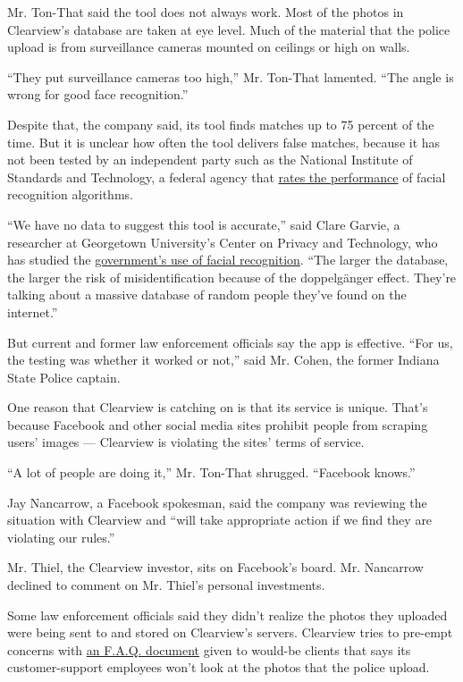 Mr. Ton-That said the tool does not always work. Most of the photos in
Clearview's database are taken at eye level. Much of the material that
the police upload is from surveillance cameras mounted on ceilings or
high on walls.

``They put surveillance cameras too high,'' Mr. Ton-That lamented. ``The
angle is wrong for good face recognition.''

Despite that, the company said, its tool finds matches up to 75 percent
of the time. But it is unclear how often the tool delivers false
matches, because it has not been tested by an independent party such as
the National Institute of Standards and Technology, a federal agency
that
\href{https://www.nist.gov/programs-projects/face-recognition-vendor-test-frvt-ongoing}{rates
the performance} of facial recognition algorithms.

``We have no data to suggest this tool is accurate,'' said Clare Garvie,
a researcher at Georgetown University's Center on Privacy and
Technology, who has studied the
\href{https://www.flawedfacedata.com/}{government's use of facial
recognition}. ``The larger the database, the larger the risk of
misidentification because of the doppelgänger effect. They're talking
about a massive database of random people they've found on the
internet.''

But current and former law enforcement officials say the app is
effective. ``For us, the testing was whether it worked or not,'' said
Mr. Cohen, the former Indiana State Police captain.

One reason that Clearview is catching on is that its service is unique.
That's because Facebook and other social media sites prohibit people
from scraping users' images --- Clearview is violating the sites' terms
of service.

``A lot of people are doing it,'' Mr. Ton-That shrugged. ``Facebook
knows.''

Jay Nancarrow, a Facebook spokesman, said the company was reviewing the
situation with Clearview and ``will take appropriate action if we find
they are violating our rules.''

Mr. Thiel, the Clearview investor, sits on Facebook's board. Mr.
Nancarrow declined to comment on Mr. Thiel's personal investments.

Some law enforcement officials said they didn't realize the photos they
uploaded were being sent to and stored on Clearview's servers. Clearview
tries to pre-empt concerns with
\href{https://int.nyt.com/data/documenthelper/6690-clearview-faq/c8b081a0bcca12e7903a/optimized/full.pdf\#page=1}{an
F.A.Q. document} given to would-be clients that says its
customer-support employees won't look at the photos that the police
upload.

